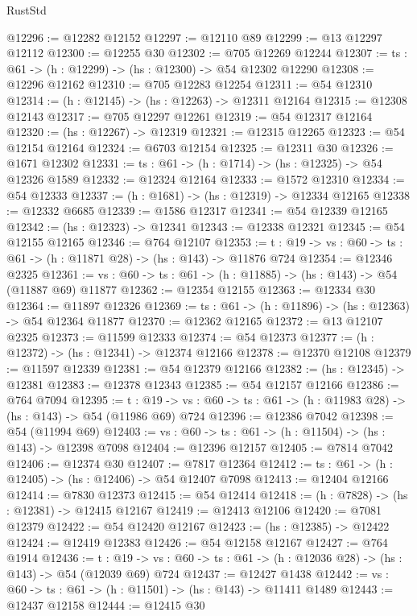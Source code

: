 \begin{lexlean}{RustStd}
\begin{coremodule}
@12296 := @12282 @12152
@12297 := @12110 @89
@12299 := @13 @12297 @12112
@12300 := @12255 @30
@12302 := @705 @12269 @12244
@12307 := {ts : @61} -> (h : @12299) -> (hs : @12300) -> @54 @12302 @12290
@12308 := @12296 @12162
@12310 := @705 @12283 @12254
@12311 := @54 @12310
@12314 := (h : @12145) -> (hs : @12263) -> @12311 @12164
@12315 := @12308 @12143
@12317 := @705 @12297 @12261
@12319 := @54 @12317 @12164
@12320 := (hs : @12267) -> @12319
@12321 := @12315 @12265
@12323 := @54 @12154 @12164
@12324 := @6703 @12154
@12325 := @12311 @30
@12326 := @1671 @12302
@12331 := {ts : @61} -> (h : @1714) -> (hs : @12325) -> @54 @12326 @1589
@12332 := @12324 @12164
@12333 := @1572 @12310
@12334 := @54 @12333
@12337 := (h : @1681) -> (hs : @12319) -> @12334 @12165
@12338 := @12332 @6685
@12339 := @1586 @12317
@12341 := @54 @12339 @12165
@12342 := (hs : @12323) -> @12341
@12343 := @12338 @12321
@12345 := @54 @12155 @12165
@12346 := @764 @12107
@12353 := {t : @19} -> {vs : @60} -> {ts : @61} -> (h : @11871 @28) -> (hs : @143) -> @11876 @724
@12354 := @12346 @2325
@12361 := {vs : @60} -> {ts : @61} -> (h : @11885) -> (hs : @143) -> @54 (@11887 @69) @11877
@12362 := @12354 @12155
@12363 := @12334 @30
@12364 := @11897 @12326
@12369 := {ts : @61} -> (h : @11896) -> (hs : @12363) -> @54 @12364 @11877
@12370 := @12362 @12165
@12372 := @13 @12107 @2325
@12373 := @11599 @12333
@12374 := @54 @12373
@12377 := (h : @12372) -> (hs : @12341) -> @12374 @12166
@12378 := @12370 @12108
@12379 := @11597 @12339
@12381 := @54 @12379 @12166
@12382 := (hs : @12345) -> @12381
@12383 := @12378 @12343
@12385 := @54 @12157 @12166
@12386 := @764 @7094
@12395 := {t : @19} ->
  {vs : @60} -> {ts : @61} -> (h : @11983 @28) -> (hs : @143) -> @54 (@11986 @69) @724
@12396 := @12386 @7042
@12398 := @54 (@11994 @69)
@12403 := {vs : @60} -> {ts : @61} -> (h : @11504) -> (hs : @143) -> @12398 @7098
@12404 := @12396 @12157
@12405 := @7814 @7042
@12406 := @12374 @30
@12407 := @7817 @12364
@12412 := {ts : @61} -> (h : @12405) -> (hs : @12406) -> @54 @12407 @7098
@12413 := @12404 @12166
@12414 := @7830 @12373
@12415 := @54 @12414
@12418 := (h : @7828) -> (hs : @12381) -> @12415 @12167
@12419 := @12413 @12106
@12420 := @7081 @12379
@12422 := @54 @12420 @12167
@12423 := (hs : @12385) -> @12422
@12424 := @12419 @12383
@12426 := @54 @12158 @12167
@12427 := @764 @1914
@12436 := {t : @19} ->
  {vs : @60} -> {ts : @61} -> (h : @12036 @28) -> (hs : @143) -> @54 (@12039 @69) @724
@12437 := @12427 @1438
@12442 := {vs : @60} -> {ts : @61} -> (h : @11501) -> (hs : @143) -> @11411 @1489
@12443 := @12437 @12158
@12444 := @12415 @30

\end{coremodule}
\end{lexlean}

